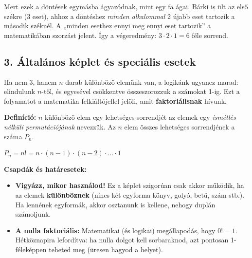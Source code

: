 \documentclass[11pt, a4paper]{article}
\begin{document}
Mert ezek a döntések egymásba ágyazódnak, mint egy fa ágai. Bárki is ült az első székre (3 eset), ahhoz a döntéshez \textit{minden alkalommal} 2 újabb eset tartozik a második széknél. A „minden esethez ennyi meg ennyi eset tartozik” a matematikában szorzást jelent. Így a végeredmény: $3 \cdot 2 \cdot 1 = 6$ féle sorrend.

\subsection*{3. Általános képlet és speciális esetek}
Ha nem 3, hanem $n$ darab különböző elemünk van, a logikánk ugyanez marad: elindulunk $n$-től, és egyesével csökkentve összeszorozzuk a számokat 1-ig. Ezt a folyamatot a matematika felkiáltójellel jelöli, amit \textbf{faktoriálisnak} hívunk.

\textbf{Definíció:} $n$ különböző elem egy lehetséges sorrendjét az elemek egy \emph{ismétlés nélküli permutációjának} nevezzük. Az $n$ elem összes lehetséges sorrendjének a száma $P_n$.

$P_n = n! = n \cdot (n - 1) \cdot (n - 2) \cdot \dots \cdot 1$

\vspace{0.2cm}
\noindent\textbf{Csapdák és határesetek:}
\begin{itemize}
    \item \textbf{Vigyázz, mikor használod!} Ez a képlet szigorúan csak akkor működik, ha az elemek \textbf{különböznek} (nincs két egyforma könyv, golyó, betű, szám stb.). Ha lennének egyformák, akkor osztanunk is kellene, nehogy duplán számoljunk.
    \item \textbf{A nulla faktoriális:} Matematikai (és logikai) megállapodás, hogy $0! = 1$. Hétköznapira lefordítva: ha nulla dolgot kell sorbaraknod, azt pontosan 1-féleképpen teheted meg (üresen hagyod a helyet).
\end{itemize}

\vspace{0.5cm}
\noindent{}
\vspace{0.5cm}
\end{document}
